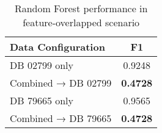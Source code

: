 \begin{table}[ht]
  \centering
  \caption{Random Forest performance in feature-overlapped scenario}
  \label{tab:random_forest_feature_overlap}
  \begin{tabular}{lc}
  \toprule
  \textbf{Data Configuration} & \textbf{F1} \\
  \midrule
  DB 02799 only & 0.9248 \\
  Combined → DB 02799 & \textbf{0.4728} \\
  \midrule
  DB 79665 only & 0.9565 \\
  Combined → DB 79665 & \textbf{0.4728} \\
  \bottomrule
  \end{tabular}
\end{table}
